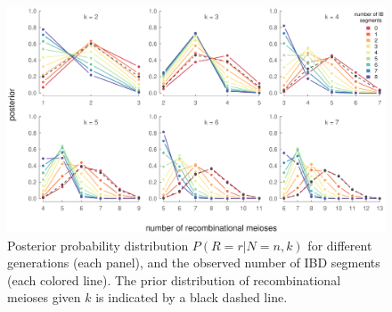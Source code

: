 \documentclass[9pt,twocolumn,twoside]{gsajnl}
\begin{document}
\begin{figure}[!ht]

  \includegraphics[width=\linewidth]{images/rm-posterior}

  \caption{Posterior probability distribution $P(R = r | N = n, k)$ for
different generations (each panel), and the observed number of IBD segments
(each colored line). The prior distribution of recombinational meioses given
$k$ is indicated by a black dashed line.}

  \label{fig:inference}

\end{figure}
\end{document}
